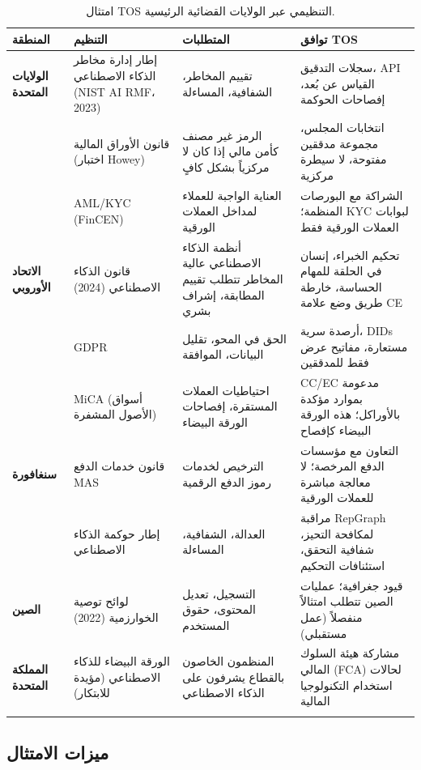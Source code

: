 \documentclass[11pt]{article}
\begin{document}
\begin{longtable}{@{}p{}p{}p{}p{}@{}}
\toprule
\textbf{المنطقة} & \textbf{التنظيم} & \textbf{المتطلبات} & \textbf{توافق TOS} \\\midrule
\textbf{الولايات المتحدة} & إطار إدارة مخاطر الذكاء الاصطناعي (NIST AI RMF، 2023) & تقييم المخاطر، الشفافية، المساءلة & سجلات التدقيق، API القياس عن بُعد، إفصاحات الحوكمة \\
 & قانون الأوراق المالية (اختبار Howey) & الرمز غير مصنف كأمن مالي إذا كان لا مركزياً بشكل كافٍ & انتخابات المجلس، مجموعة مدققين مفتوحة، لا سيطرة مركزية \\
 & AML/KYC (FinCEN) & العناية الواجبة للعملاء لمداخل العملات الورقية & الشراكة مع البورصات المنظمة؛ KYC لبوابات العملات الورقية فقط \\
\textbf{الاتحاد الأوروبي} & قانون الذكاء الاصطناعي (2024) & أنظمة الذكاء الاصطناعي عالية المخاطر تتطلب تقييم المطابقة، إشراف بشري & تحكيم الخبراء، إنسان في الحلقة للمهام الحساسة، خارطة طريق وضع علامة CE \\
 & GDPR & الحق في المحو، تقليل البيانات، الموافقة & أرصدة سرية، DIDs مستعارة، مفاتيح عرض فقط للمدققين \\
 & MiCA (أسواق الأصول المشفرة) & احتياطيات العملات المستقرة، إفصاحات الورقة البيضاء & CC/EC مدعومة بموارد مؤكدة بالأوراكل؛ هذه الورقة البيضاء كإفصاح \\
\textbf{سنغافورة} & قانون خدمات الدفع MAS & الترخيص لخدمات رموز الدفع الرقمية & التعاون مع مؤسسات الدفع المرخصة؛ لا معالجة مباشرة للعملات الورقية \\
 & إطار حوكمة الذكاء الاصطناعي & العدالة، الشفافية، المساءلة & مراقبة RepGraph لمكافحة التحيز، شفافية التحقق، استئنافات التحكيم \\
\textbf{الصين} & لوائح توصية الخوارزمية (2022) & التسجيل، تعديل المحتوى، حقوق المستخدم & قيود جغرافية؛ عمليات الصين تتطلب امتثالاً منفصلاً (عمل مستقبلي) \\
\textbf{المملكة المتحدة} & الورقة البيضاء للذكاء الاصطناعي (مؤيدة للابتكار) & المنظمون الخاصون بالقطاع يشرفون على الذكاء الاصطناعي & مشاركة هيئة السلوك المالي (FCA) لحالات استخدام التكنولوجيا المالية \\
\bottomrule
\caption{امتثال TOS التنظيمي عبر الولايات القضائية الرئيسية.}
\end{longtable}

\subsection{ميزات الامتثال}
\end{document}
